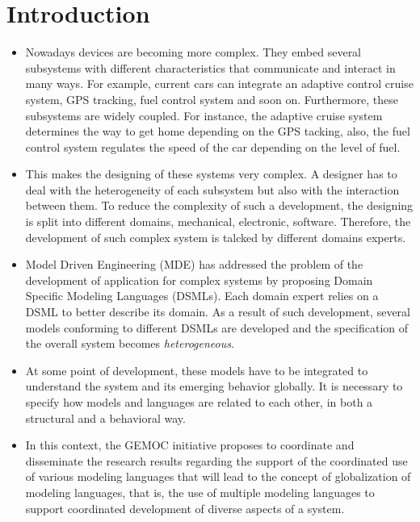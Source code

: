 \chapter{Introduction}


\begin{itemize}
	
	\item Nowadays devices are becoming more complex. They embed several subsystems with different characteristics that communicate and interact in many ways. For example, current cars can integrate an adaptive control cruise system, GPS tracking, fuel control system and soon on. Furthermore, these subsystems are widely coupled. For instance, the adaptive cruise system determines the way to get home depending on the GPS tacking, also, the fuel control system regulates the speed of the car depending on the level of fuel.
	
	\item This makes the designing of these systems very complex. A designer has to deal with the heterogeneity of each subsystem but also with the interaction between them. To reduce the complexity of such a development, the designing is split into different domains, \eg mechanical, electronic, software. Therefore, the development of such complex system is talcked by different domains experts.
	
	\item Model Driven Engineering (MDE) has addressed the problem of the development of application for complex systems by proposing Domain Specific Modeling Languages (DSMLs). Each domain expert relies on a DSML to better describe its domain. As a result of such development, several models conforming to different DSMLs are developed and the specification of the overall system becomes \emph{heterogeneous}.
	\item At some point of development, these models have to be integrated to understand the system and its emerging behavior globally. It is necessary to specify how models and languages are related to each other, in both a structural and a behavioral way.
	 
	\item In this context, the GEMOC initiative proposes to coordinate and disseminate the research results regarding the support of the coordinated use of various modeling languages that will lead to the concept of globalization of modeling languages, that is, the use of multiple modeling languages to support coordinated development of diverse aspects of a system. 
	

\end{itemize}
